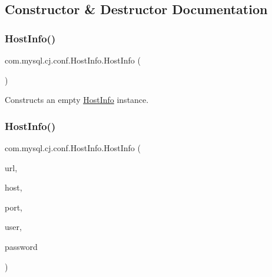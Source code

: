 \subsection{Constructor \& Destructor Documentation}
\mbox{\label{classcom_1_1mysql_1_1cj_1_1conf_1_1_host_info_a4560d8ddc8f66b75d4285b0bb1e3a2c0}} 
\subsubsection{\texorpdfstring{Host\+Info()}{HostInfo()}\hspace{0.1cm}{\footnotesize\ttfamily [1/5]}}
{\footnotesize\ttfamily com.\+mysql.\+cj.\+conf.\+Host\+Info.\+Host\+Info (\begin{DoxyParamCaption}{ }\end{DoxyParamCaption})}

Constructs an empty \mbox{\hyperlink{classcom_1_1mysql_1_1cj_1_1conf_1_1_host_info}{Host\+Info}} instance. \mbox{\label{classcom_1_1mysql_1_1cj_1_1conf_1_1_host_info_abf279f3212ad1fe272189757ef090d90}} 
\subsubsection{\texorpdfstring{Host\+Info()}{HostInfo()}\hspace{0.1cm}{\footnotesize\ttfamily [2/5]}}
{\footnotesize\ttfamily com.\+mysql.\+cj.\+conf.\+Host\+Info.\+Host\+Info (\begin{DoxyParamCaption}\item[{\mbox{\hyperlink{interfacecom_1_1mysql_1_1cj_1_1conf_1_1_database_url_container}{Database\+Url\+Container}}}]{url,  }\item[{String}]{host,  }\item[{int}]{port,  }\item[{String}]{user,  }\item[{String}]{password }\end{DoxyParamCaption})}

